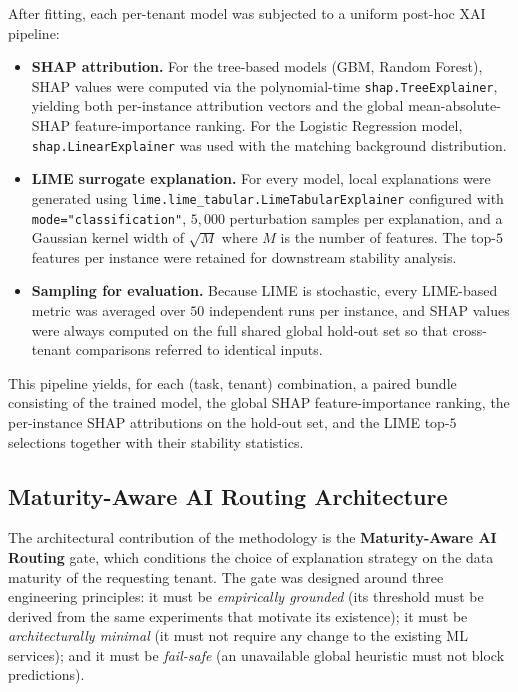 After fitting, each per-tenant model was subjected to a uniform post-hoc XAI
pipeline:

\begin{itemize}
    \item \textbf{SHAP attribution.} For the tree-based models
    (GBM, Random Forest), SHAP values were computed via the polynomial-time
    \texttt{shap.TreeExplainer}, yielding both per-instance attribution
    vectors and the global mean-absolute-SHAP feature-importance ranking.
    For the Logistic Regression model, \texttt{shap.LinearExplainer} was
    used with the matching background distribution.
    \item \textbf{LIME surrogate explanation.} For every model, local
    explanations were generated using
    \texttt{lime.lime\_tabular.LimeTabularExplainer} configured with
    \texttt{mode="classification"}, $5{,}000$ perturbation samples per
    explanation, and a Gaussian kernel width of $\sqrt{M}$ where $M$ is the
    number of features. The top-$5$ features per instance were retained for
    downstream stability analysis.
    \item \textbf{Sampling for evaluation.} Because LIME is stochastic,
    every LIME-based metric was averaged over $50$ independent runs per
    instance, and SHAP values were always computed on the full shared global
    hold-out set so that cross-tenant comparisons referred to identical
    inputs.
\end{itemize}

This pipeline yields, for each (task, tenant) combination, a paired bundle
consisting of the trained model, the global SHAP feature-importance ranking,
the per-instance SHAP attributions on the hold-out set, and the LIME top-$5$
selections together with their stability statistics.

\subsection{Maturity-Aware AI Routing Architecture}
\label{subsec:routing-arch}

The architectural contribution of the methodology is the
\textbf{Maturity-Aware AI Routing} gate, which conditions the choice of
explanation strategy on the data maturity of the requesting tenant. The
gate was designed around three engineering principles: it must be
\emph{empirically grounded} (its threshold must be derived from the same
experiments that motivate its existence); it must be \emph{architecturally
minimal} (it must not require any change to the existing ML services); and
it must be \emph{fail-safe} (an unavailable global heuristic must not block
predictions).

